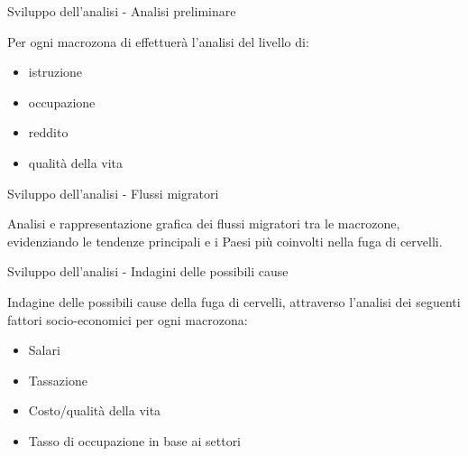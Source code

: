 \documentclass[
  ignorenonframetext,
]{beamer}
\providecommand{\tightlist}{%
  \setlength{\itemsep}{0pt}\setlength{\parskip}{0pt}}
\begin{document}
\begin{frame}{Sviluppo dell'analisi - Analisi preliminare}
\protect{}\label{sviluppo-dellanalisi---analisi-preliminare}
\begin{center}
Per ogni macrozona di effettuerà l'analisi del livello di:
\end{center}

\begin{itemize}
\tightlist
\item
  istruzione
\item
  occupazione
\item
  reddito
\item
  qualità della vita
\end{itemize}
\end{frame}

\begin{frame}{Sviluppo dell'analisi - Flussi migratori}
\protect{}\label{sviluppo-dellanalisi---flussi-migratori}
\begin{center}
Analisi e rappresentazione grafica dei flussi migratori tra le macrozone, evidenziando le tendenze principali e i Paesi più coinvolti nella fuga di cervelli.
\end{center}
\end{frame}

\begin{frame}{Sviluppo dell'analisi - Indagini delle possibili cause}
\protect{}\label{sviluppo-dellanalisi---indagini-delle-possibili-cause}
\begin{center}
Indagine delle possibili cause della fuga di cervelli, attraverso l'analisi dei seguenti fattori socio-economici per ogni macrozona:
\end{center}

\begin{itemize}
\tightlist
\item
  Salari
\item
  Tassazione
\item
  Costo/qualità della vita
\item
  Tasso di occupazione in base ai settori
\end{itemize}
\end{frame}
\end{document}
